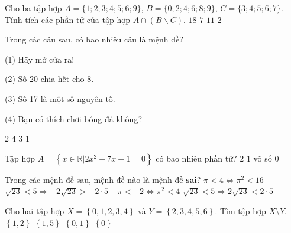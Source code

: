 \begin{ex}%
	Cho ba tập hợp $A=\{1; 2; 3; 4; 5; 6; 9\}$, $B=\{0; 2; 4; 6; 8; 9\}$, $C=\{3; 4; 5; 6; 7\}$. Tính tích các phần tử của tập hợp $A \cap (B \backslash C)$.
	\choice
	{\True $18$}
	{$7$}
	{$11$}
	{$2$}
	\loigiai{
	}
\end{ex}

\begin{ex}%
	Trong các câu sau, có bao nhiêu câu là mệnh đề?
	\begin{listEX}[2]
		\item [(1)]\quad Hãy mở cửa ra!
		\item [(2)]\quad Số 20 chia hết cho 8.
		\item [(3)] \quad Số 17 là một số nguyên tố.
		\item [(4)] \quad Bạn có thích chơi bóng đá không?
	\end{listEX}
	\choice
	{\True $2$}
	{$4$}
	{$3$}
	{$1$}
	\loigiai{
	}
\end{ex}


\begin{ex}%
	Tập hợp $A=\left\{x\in \mathbb{R}\big| 2x^2-7x+1=0\right\}$ có bao nhiêu phần tử?
	\choice
	{\True $2$}
	{$1$}
	{vô số}
	{$0$}
\end{ex}

\begin{ex}%
	Trong các mệnh đề sau, mệnh đề nào là mệnh đề \textbf{sai}?
	\choice
	{$\pi <4 \Leftrightarrow \pi^2<16$}
	{$\sqrt{23}<5 \Rightarrow -2\sqrt{23}>-2 \cdot 5$}
	{\True $-\pi <-2 \Leftrightarrow \pi^2<4$}
	{$\sqrt{23}<5 \Rightarrow 2\sqrt{23}<2 \cdot 5$}
\end{ex}

\begin{ex}%
	Cho hai tập hợp $X=\left\{0, 1, 2, 3, 4\right\}$ và $Y=\left\{ 2, 3, 4, 5, 6 \right\}$. Tìm tập hợp $X\setminus Y$.
	\choice
	{$\left\{ 1, 2 \right\}$}
	{$\left\{ 1, 5 \right\}$}
	{\True $\left\{ 0, 1 \right\}$}
	{$\left\{ 0 \right\}$}
	\loigiai{
	}
\end{ex}

